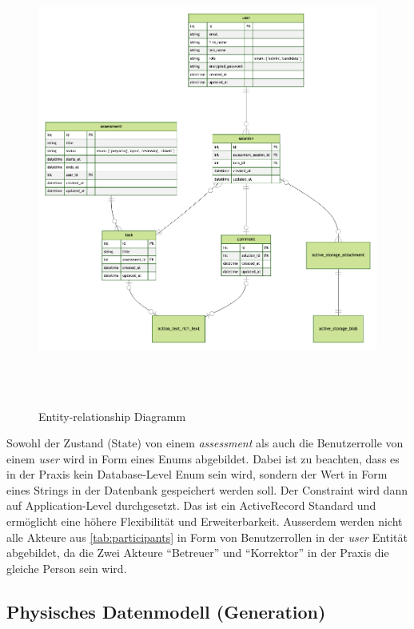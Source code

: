 \begin{figure}[H]
    \centering
    \includegraphics[height=15cm]{images/diagrams/entity-relation.png}
    \caption{\label{fig:erd}Entity-relationship Diagramm}
\end{figure}

\newpage

Sowohl der Zustand (State) von einem \emph{assessment} als auch die Benutzerrolle von einem \emph{user} wird in Form eines Enums abgebildet. Dabei ist zu beachten, dass es in der Praxis kein Database-Level Enum sein wird,
sondern der Wert in Form eines Strings in der Datenbank gespeichert werden soll. Der Constraint wird dann auf Application-Level durchgesetzt. Das ist ein ActiveRecord Standard und ermöglicht eine höhere Flexibilität und Erweiterbarkeit.
Ausserdem werden nicht alle Akteure aus \ref{tab:participants} in Form von Benutzerrollen in der \emph{user} Entität abgebildet, da die Zwei Akteure \enquote{Betreuer} und \enquote{Korrektor} in der Praxis die gleiche Person sein wird.

\subsection{Physisches Datenmodell (Generation)}

